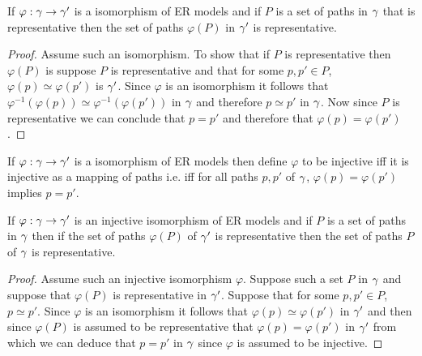 \begin{lemma}
If $\varphi: \gamma \rightarrow \gamma'$ is a isomorphism of ER models and
if $P$ is a  set of paths in $\gamma$ that is representative then the set of paths $\varphi(P)$ in $\gamma'$ is representative. 
\end{lemma}
\begin{proof}
Assume such an isomorphism. To show that if $P$ is representative then $\varphi(P)$ is suppose $P$ is representative and that for some $p,p' \in P$,  $\varphi(p) \simeq \varphi(p')$ is $\gamma'$.  Since $\varphi$ is an isomorphism
it follows that $\varphi^{-1}(\varphi(p)) \simeq \varphi^{-1}(\varphi(p'))$ in $\gamma$ and therefore $p \simeq p'$ in
$\gamma$. Now since $P$ is representative we can conclude that $p=p'$ and therefore that $\varphi(p)=\varphi(p')$.
\end{proof}

\begin{definition}
If $\varphi: \gamma \rightarrow \gamma'$ is a isomorphism of ER models then define $\varphi$ to be injective iff
it is injective as a mapping of paths i.e. iff  for all paths $p,p'$ of $\gamma$, $\varphi(p)=\varphi(p')$ implies $p=p'$.
\end{definition}


\begin{lemma}
If $\varphi: \gamma \rightarrow \gamma'$ is an injective isomorphism of ER models and
if $P$ is a  set of paths in $\gamma$ then if the set of paths $\varphi(P)$ of $\gamma'$ is representative 
 then the set of paths $P$ of $\gamma$ is representative. 
\end{lemma}
\begin{proof}
Assume such an injective isomorphism $\varphi$. Suppose such a set $P$ in $\gamma$ and suppose that $\varphi(P)$ is representative in $\gamma'$.  Suppose that  for some $p,p' \in P$, $p \simeq p'$. Since $\varphi$ is an isomorphism it follows that $\varphi(p) \simeq \varphi(p')$ in $\gamma'$ and then since $\varphi(P)$ is assumed to be representative 
that $\varphi(p) = \varphi(p')$ in $\gamma'$
 from which we can deduce that $p=p'$ in $\gamma$ since $\varphi$ is assumed to be injective. 
\end{proof}

